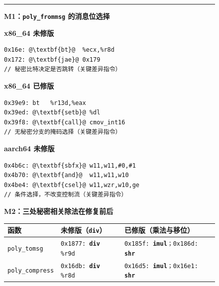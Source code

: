 \begin{figure}[H]
\centering
\noindent\begin{minipage}{0.96\textwidth}
\hrule
\vspace{0.4em}
\textbf{M1：\texttt{poly\_frommsg} 的消息位选择}
\par\smallskip
\begin{minipage}[t]{0.29\textwidth}
\textbf{x86\_64 未修版}
\begin{lstlisting}[numbers=none,frame=single,basicstyle=\ttfamily\tiny,columns=fullflexible,keepspaces=true,xleftmargin=0pt,escapeinside={@@}]
0x16e: @\textbf{bt}@  %ecx,%r8d
0x172: @\textbf{jae}@ 0x179
// 秘密比特决定是否跳转（关键差异指令）
\end{lstlisting}
\end{minipage}\hfill
\begin{minipage}[t]{0.29\textwidth}
\textbf{x86\_64 已修版}
\begin{lstlisting}[numbers=none,frame=single,basicstyle=\ttfamily\tiny,columns=fullflexible,keepspaces=true,xleftmargin=0pt,escapeinside={@@}]
0x39e9: bt   %r13d,%eax
0x39ed: @\textbf{setb}@ %dl
0x39f8: @\textbf{call}@ cmov_int16
// 无秘密分支的掩码选择（关键差异指令）
\end{lstlisting}
\end{minipage}\hfill
\begin{minipage}[t]{0.29\textwidth}
\textbf{aarch64 未修版}
\begin{lstlisting}[numbers=none,frame=single,basicstyle=\ttfamily\tiny,columns=fullflexible,keepspaces=true,xleftmargin=0pt,escapeinside={@@}]
0x4b6c: @\textbf{sbfx}@ w11,w11,#0,#1
0x4b70: @\textbf{and}@  w11,w11,w10
0x4be4: @\textbf{csel}@ w11,wzr,w10,ge
// 条件选择，不改变控制流（关键差异指令）
\end{lstlisting}
\end{minipage}
\par\smallskip
\textbf{M2：三处秘密相关除法在修复前后}
\par
{\scriptsize
\begin{tabularx}{\textwidth}{|>{\raggedright\arraybackslash}p{2.35cm}|>{\raggedright\arraybackslash}X|>{\raggedright\arraybackslash}X|}
\hline
函数 & 未修版（\texttt{\textbf{div}}） & 已修版（乘法与移位） \\
\hline
\texttt{poly\_tomsg} & \texttt{0x1877: \textbf{div} \%r9d} & \texttt{0x185f: \textbf{imul}；0x186d: \textbf{shr}} \\
\hline
\texttt{poly\_compress} & \texttt{0x16db: \textbf{div} \%r8d} & \texttt{0x16d5: \textbf{imul}；0x16e1: \textbf{shr}} \\

\end{tabularx}}
\end{minipage}
\end{figure}
